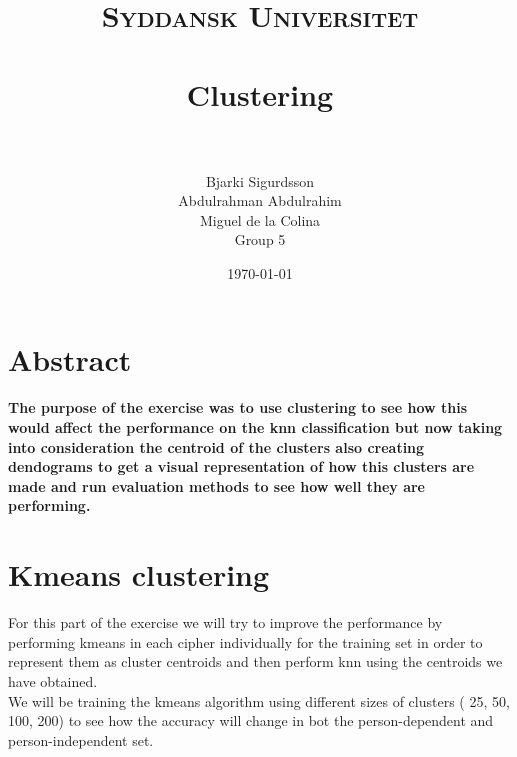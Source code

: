 \documentclass[paper=a4, fontsize=11pt]{scrartcl} %
\title{	
\normalfont \normalsize 
\textsc{Syddansk Universitet} \\ [25pt] 
\horrule{0.5pt} \\[0.4cm] %
\huge Clustering \\ %
\horrule{2pt} \\[0.5cm] %
}
\author{Bjarki Sigurdsson \\ Abdulrahman Abdulrahim \\ Miguel de la Colina \\ Group 5}
\date{\normalsize\today} %
\begin{document}
\maketitle %



\section*{Abstract}

\paragraph{The purpose of the exercise was to use clustering to see how this would affect the performance on the knn classification but now taking into consideration the centroid of the clusters also creating dendograms to get a visual representation of how this clusters are made and run evaluation methods to see how well they are performing.}




\section{Kmeans clustering}
For this part of the exercise we will try to improve the performance by performing kmeans in each cipher individually for the training set in order to represent them as cluster centroids and then perform knn using the centroids we have obtained. \\

We will be training the kmeans algorithm using different sizes of clusters ( 25, 50, 100, 200) to see how the accuracy  will change in bot the person-dependent and person-independent set. 
\end{document}
